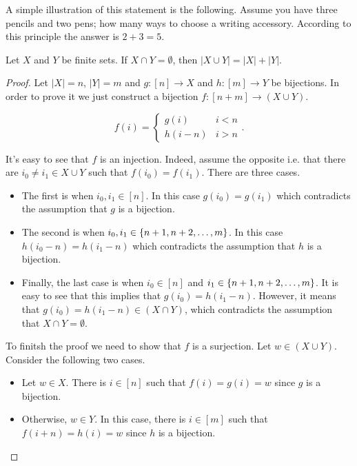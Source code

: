 A simple illustration of this statement is the following. Assume you have three
pencils and two pens; how many ways to choose a writing accessory. According to
this principle the answer is $2 + 3 = 5$.
\begin{theorem}
  Let $X$ and $Y$ be finite sets. If $X \cap Y = \emptyset$, then $|X \cup Y| =
  |X| + |Y|$.
\end{theorem}
\begin{proof}
  Let $|X| = n$, $|Y| = m$ and $g : [n] \to X$ and $h : [m] \to Y$ be
  bijections. In order to prove it we just construct a bijection
  $f : [n + m] \to (X \cup Y)$.

  $$
    f(i) =
    \begin{cases}
        g(i) & i < n \\
        h(i  - n) & i > n
    \end{cases}.
  $$

  It's easy to see that $f$ is an injection. Indeed, assume the opposite i.e.
  that there are $i_0 \neq i_1 \in X \cup Y$ such that $f(i_0) = f(i_1)$.
  There are three cases.
  \begin{itemize}
    \item The first is when $i_0, i_1 \in [n]$. In this case $g(i_0) = g(i_1)$
      which contradicts the assumption that $g$ is a bijection.
    \item The second is when $i_0, i_1 \in \set{n + 1, n + 2, \dots, m}$.
      In this case $h(i_0 - n) = h(i_1 - n)$ which contradicts the assumption
      that $h$ is a bijection.
    \item Finally, the last case is when $i_0 \in [n]$ and
      $i_1 \in \set{n + 1, n + 2, \dots, m}$. It is easy to see that this
      implies that $g(i_0) = h(i_1 - n)$. However, it
      means that $g(i_0) = h(i_1 - n) \in (X \cap Y)$, which contradicts the
      assumption that $X \cap Y = \emptyset$.
  \end{itemize}

  To finitsh the proof we need to show that $f$ is a surjection. Let
  $w \in (X \cup Y)$. Consider the following two cases.
  \begin{itemize}
    \item Let $w \in X$. There is $i \in [n]$ such that $f(i) = g(i) = w$ since
      $g$ is a bijection.
    \item Otherwise, $w \in Y$. In this case, there is $i \in [m]$ such that
      $f(i + n) = h(i) = w$ since $h$ is a bijection.
  \end{itemize}
\end{proof}

